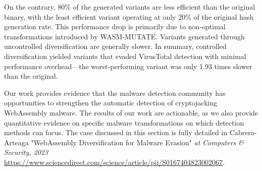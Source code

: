 On the contrary, 80\% of the generated variants are less efficient than the original binary, with the least efficient variant operating at only 20\% of the original hash generation rate. 
This performance drop is primarily due to non-optimal transformations introduced by WASM-MUTATE. 
Variants generated through uncontrolled diversification are generally slower.
In summary, controlled diversification yielded variants that evaded VirusTotal detection with minimal performance overhead—the worst-performing variant was only 1.93 times slower than the original.


\begin{tcolorbox}[title=Contribution paper,boxrule=1pt,arc=.2em,boxsep=1.0mm]
    Our work provides evidence that the malware detection community has opportunities to strengthen the automatic detection of cryptojacking WebAssembly malware. 
    The results of our work are actionable, as we also provide quantitative evidence on specific malware transformations on which detection methods can focus. 
    The case discussed in this section is fully detailed in Cabrera-Arteaga \etal "WebAssembly Diversification for Malware Evasion"
    \emph{at Computers \& Security, 2023}
    \url{https://www.sciencedirect.com/science/article/pii/S0167404823002067}. 
\end{tcolorbox}
